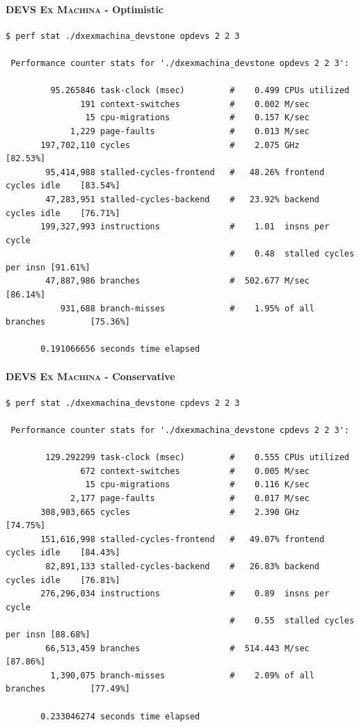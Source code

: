 \documentclass[8pt,a4paper]{report}
\begin{document}
\paragraph{\textsc{DEVS Ex Machina} - Optimistic}
\begin{Verbatim}[fontsize=\small]
$ perf stat ./dxexmachina_devstone opdevs 2 2 3

 Performance counter stats for './dxexmachina_devstone opdevs 2 2 3':

         95.265846 task-clock (msec)         #    0.499 CPUs utilized          
               191 context-switches          #    0.002 M/sec                  
                15 cpu-migrations            #    0.157 K/sec                  
             1,229 page-faults               #    0.013 M/sec                  
       197,702,110 cycles                    #    2.075 GHz                     [82.53%]
        95,414,988 stalled-cycles-frontend   #   48.26% frontend cycles idle    [83.54%]
        47,283,951 stalled-cycles-backend    #   23.92% backend  cycles idle    [76.71%]
       199,327,993 instructions              #    1.01  insns per cycle        
                                             #    0.48  stalled cycles per insn [91.61%]
        47,887,986 branches                  #  502.677 M/sec                   [86.14%]
           931,688 branch-misses             #    1.95% of all branches         [75.36%]

       0.191066656 seconds time elapsed
\end{Verbatim}
\paragraph{\textsc{DEVS Ex Machina} - Conservative}
\begin{Verbatim}[fontsize=\small]
$ perf stat ./dxexmachina_devstone cpdevs 2 2 3

 Performance counter stats for './dxexmachina_devstone cpdevs 2 2 3':

        129.292299 task-clock (msec)         #    0.555 CPUs utilized          
               672 context-switches          #    0.005 M/sec                  
                15 cpu-migrations            #    0.116 K/sec                  
             2,177 page-faults               #    0.017 M/sec                  
       308,983,665 cycles                    #    2.390 GHz                     [74.75%]
       151,616,998 stalled-cycles-frontend   #   49.07% frontend cycles idle    [84.43%]
        82,891,133 stalled-cycles-backend    #   26.83% backend  cycles idle    [76.81%]
       276,296,034 instructions              #    0.89  insns per cycle        
                                             #    0.55  stalled cycles per insn [88.68%]
        66,513,459 branches                  #  514.443 M/sec                   [87.86%]
         1,390,075 branch-misses             #    2.09% of all branches         [77.49%]

       0.233046274 seconds time elapsed
\end{Verbatim}
\end{document}
